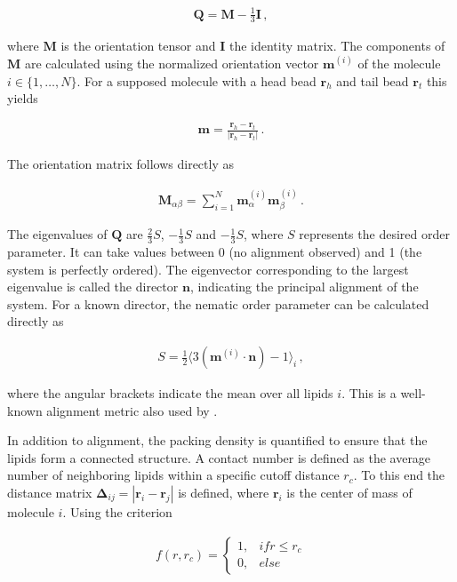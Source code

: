 \documentclass[
    11pt,
    a4paper,
    oneside,        %
    BCOR=10mm,      %
    parskip=half,   %
    listof=nototoc,   %
    bibliography=totoc %
]{scrreprt}
\begin{document}
\begin{align}
    \mathbf{Q} = \mathbf{M} - \frac{1}{3}\mathbf{I}\, ,
\end{align}

where $\mathbf{M}$ is the orientation tensor and $\mathbf{I}$ the identity matrix. The components of $\mathbf{M}$ are calculated using the normalized orientation vector $\mathbf{m}^{(i)}$ of the molecule $i \in \{1,\dots,N \}$. For a supposed molecule with a head bead $\mathbf{r}_h$ and tail bead $\mathbf{r}_t$ this yields

\begin{align}
    \mathbf{m} = \frac{\mathbf{r}_h - \mathbf{r}_t}{|\mathbf{r}_h - \mathbf{r}_t|}\, .
\end{align}

The orientation matrix follows directly as

\begin{align}
    \mathbf{M}_{\alpha \beta} = \sum_{i=1}^N \mathbf{m}_\alpha^{(i)}\mathbf{m}_\beta^{(i)}\, .
\end{align}

The eigenvalues of $\mathbf{Q}$ are $\frac{2}{3}S$, $-\frac{1}{3}S$ and $-\frac{1}{3}S$, where $S$ represents the desired order parameter. It can take values between 0 (no alignment observed) and 1 (the system is perfectly ordered). The eigenvector corresponding to the largest eigenvalue is called the director $\mathbf{n}$, indicating the principal alignment of the system. For a known director, the nematic order parameter can be calculated directly as 

\begin{align}
    S = \frac{1}{2} \langle 3(\mathbf{m}^{(i)}\cdot \mathbf{n}) - 1 \rangle_i\, ,
\end{align}

where the angular brackets indicate the mean over all lipids $i$. This is a well-known alignment metric also used by \citeauthor{Cooke_bending_mod} \cite{Cooke_bending_mod}.

In addition to alignment, the packing density is quantified to ensure that the lipids form a connected structure. A contact number is defined as the average number of neighboring lipids within a specific cutoff distance $r_c$. To this end the distance matrix $\mathbf{\Delta}_{ij} = |\mathbf{r}_i - \mathbf{r}_j|$ is defined, where $\mathbf{r}_i$ is the center of mass of molecule $i$. Using the criterion 

\begin{align}
    f(r, r_c) = \begin{cases}
        1, & if r \leq r_c \\
        0, & else 
    \end{cases}
\end{align}
\end{document}
